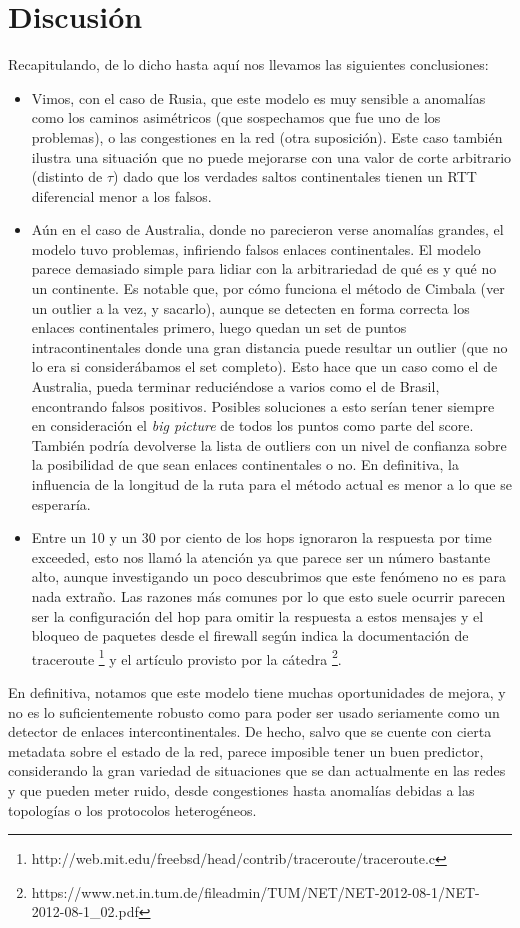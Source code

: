 \section{Discusión}

Recapitulando, de lo dicho hasta aquí nos llevamos las siguientes conclusiones:

\begin{itemize}
	\item Vimos, con el caso de Rusia, que este modelo es muy sensible a anomalías como los caminos asimétricos (que sospechamos que fue uno de los problemas), o las congestiones en la red (otra suposición). Este caso también ilustra una situación que no puede mejorarse con una valor de corte arbitrario (distinto de $\tau$) dado que los verdades saltos continentales tienen un RTT diferencial menor a los falsos.
	\item Aún en el caso de Australia, donde no parecieron verse anomalías grandes, el modelo tuvo problemas, infiriendo falsos enlaces continentales. El modelo parece demasiado simple para lidiar con la arbitrariedad de qué es y qué no un continente. Es notable que, por cómo funciona el método de Cimbala (ver un outlier a la vez, y sacarlo), aunque se detecten en forma correcta los enlaces continentales primero, luego quedan un set de puntos intracontinentales donde una gran distancia puede resultar un outlier (que no lo era si considerábamos el set completo). Esto hace que un caso como el de Australia, pueda terminar reduciéndose a varios como el de Brasil, encontrando falsos positivos. Posibles soluciones a esto serían tener siempre en consideración el \emph{big picture} de todos los puntos como parte del score. También podría devolverse la lista de outliers con un nivel de confianza sobre la posibilidad de que sean enlaces continentales o no. En definitiva, la influencia de la longitud de la ruta para el método actual es menor a lo que se esperaría.
	\item Entre un 10 y un 30 por ciento de los hops ignoraron la respuesta por time exceeded, esto nos llamó la atención ya que parece ser un número bastante alto, aunque investigando un poco descubrimos que este fenómeno no es para nada extraño. Las razones más comunes por lo que esto suele ocurrir parecen ser la configuración del hop para omitir la respuesta a estos mensajes y el bloqueo de paquetes desde el firewall según indica la documentación de traceroute \footnote{http://web.mit.edu/freebsd/head/contrib/traceroute/traceroute.c} y el artículo provisto por la cátedra \footnote{https://www.net.in.tum.de/fileadmin/TUM/NET/NET-2012-08-1/NET-2012-08-1\_02.pdf}.

\end{itemize}

En definitiva, notamos que este modelo tiene muchas oportunidades de mejora, y no es lo suficientemente robusto como para poder ser usado seriamente como un detector de enlaces intercontinentales. De hecho, salvo que se cuente con cierta metadata sobre el estado de la red, parece imposible tener un buen predictor, considerando la gran variedad de situaciones que se dan actualmente en las redes y que pueden meter ruido, desde congestiones hasta anomalías debidas a las topologías o los protocolos heterogéneos.
